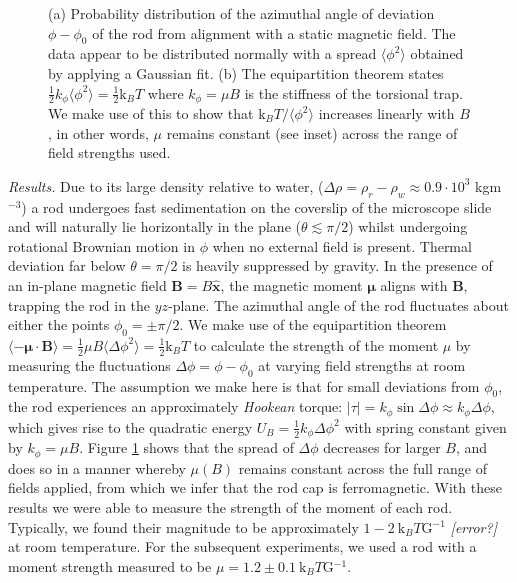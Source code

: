 \documentclass[aps,prl,twocolumn,superscriptaddress]{revtex4-1}
\newcommand{\vcrm}[1]{\mathbf{#1}}
\newcommand{\hvcrm}[1]{\mathbf{\hat{#1}}}
\newcommand{\vc}[1]{\boldsymbol{#1}}
\newcommand{\kk}{\mathrm{k}_B}
\begin{document}
\begin{figure}
	\centering
	\caption{\footnotesize (a) Probability distribution of the azimuthal angle of deviation $\phi-\phi_0$ of the rod from alignment with a static magnetic field. The data appear to be distributed normally with a spread $\langle \phi^2 \rangle$ obtained by applying a Gaussian fit. (b) The equipartition theorem states $\frac{1}{2} k_\phi \langle \phi^2 \rangle = \frac{1}{2}\kk T$ where $k_\phi =\mu B$ is the stiffness of the torsional trap. We make use of this to show that $\kk T / \langle \phi^2 \rangle $ increases linearly with $B$, in other words, $\mu$ remains constant (see inset) across the range of field strengths used.\label{fig:trap}}
\end{figure}



\emph{Results.} Due to its large density relative to water, ($\Delta\rho = \rho_r - \rho_w \approx 0.9 \cdot 10^3$ kgm$^{-3}$) a rod undergoes fast sedimentation on the coverslip of the microscope slide and will naturally lie horizontally in the plane ($\theta\lesssim\pi/2$) whilst undergoing rotational Brownian motion in $\phi$ when no external field is present. Thermal deviation far below $\theta=\pi/2$ is heavily suppressed by gravity. In the presence of an in-plane magnetic field $\vcrm{B}=B\hvcrm{x}$, the magnetic moment $\vc{\mu}$ aligns with $\vcrm{B}$, trapping the rod in the $yz$-plane. The azimuthal angle of the rod fluctuates about either the points $\phi_0=\pm\pi/2$. We make use of the equipartition theorem $\langle -\vc{\mu}\cdot\vcrm{B}\rangle = \frac{1}{2}\mu B \langle \Delta\phi^2 \rangle = \frac{1}{2}\kk T$ to calculate the strength of the moment $\mu$ by measuring the fluctuations $\Delta\phi=\phi-\phi_0$ at varying field strengths at room temperature. The assumption we make here is that for small deviations from $\phi_0$, the rod experiences an approximately \emph{Hookean} torque: $|\tau| = k_\phi \sin{\Delta\phi}\approx k_\phi\Delta\phi$, which gives rise to the quadratic energy $U_B=\frac{1}{2}k_\phi \Delta\phi^2$ with spring constant given by $k_\phi=\mu B$. Figure \ref{fig:trap} shows that the spread of $\Delta\phi$ decreases for larger $B$, and does so in a manner whereby $\mu(B)$ remains constant across the full range of fields applied, from which we infer that the rod cap is ferromagnetic. With these results we were able to measure the strength of the moment of each rod. Typically, we found their magnitude to be approximately $1-2 \ \kk T$G$^{-1}$ \emph{[error?]} at room temperature. For the subsequent experiments, we used a rod with a moment strength measured to be $\mu = 1.2\pm0.1\ \kk T$G$^{-1}$.
\end{document}
